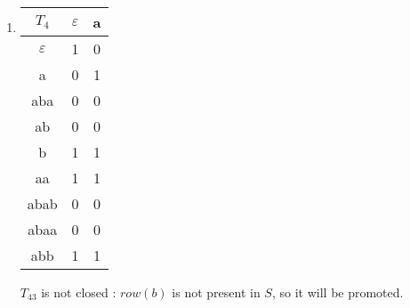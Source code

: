 \begin{enumerate}
  \item \begin{minipage}{0.3\textwidth}
          \begin{tabular}{c||c|c}
            $T_4$         & $\varepsilon$ & a \\
            \hline\hline
            $\varepsilon$ & 1             & 0 \\
            a             & 0             & 1 \\
            aba           & 0             & 0 \\
            ab            & 0             & 0 \\
            \hline\hline
            b             & 1             & 1 \\
            aa            & 1             & 1 \\
            abab          & 0             & 0 \\
            abaa          & 0             & 0 \\
            abb           & 1             & 1 \\
          \end{tabular}
        \end{minipage} \quad
        \begin{minipage}{0.5\textwidth}
          $T_43$ is not closed : $row(b)$ is not present in $S$, so it will be promoted.
        \end{minipage}


\end{enumerate}
